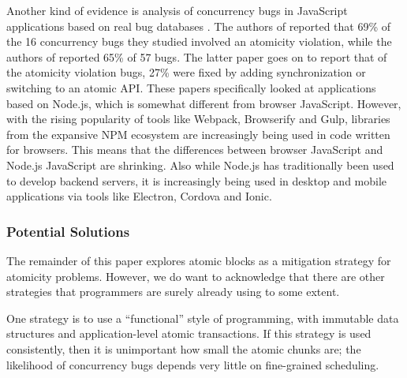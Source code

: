 \documentclass[acmsmall,anonymous,review]{acmart}\settopmatter{printfolios=true,printccs=false,printacmref=false}
\begin{document}

Another kind of evidence is analysis of concurrency bugs in JavaScript applications based on real bug databases \cite{Davis2017, Hong2014, Wang2017}.
The authors of \cite{Davis2017} reported that 69\% of the 16 concurrency bugs they studied involved an atomicity violation, while the authors of \cite{Wang2017} reported 65\% of 57 bugs.
The latter paper goes on to report that of the atomicity violation bugs, 27\% were fixed by adding synchronization or switching to an atomic API.
These papers specifically looked at applications based on Node.js, which is somewhat different from browser JavaScript.
However, with the rising popularity of tools like Webpack, Browserify and Gulp, libraries from the expansive NPM ecosystem are increasingly being used in code written for browsers.
This means that the differences between browser JavaScript and Node.js JavaScript are shrinking.
Also while Node.js has traditionally been used to develop backend servers, it is increasingly being used in desktop and mobile applications via tools like Electron, Cordova and Ionic.


\subsubsection{Potential Solutions}

The remainder of this paper explores atomic blocks as a mitigation strategy for atomicity problems.
However, we do want to acknowledge that there are other strategies that programmers are surely already using to some extent.

One strategy is to use a ``functional'' style of programming, with immutable data structures and application-level atomic transactions.
If this strategy is used consistently, then it is unimportant how small the atomic chunks are; the likelihood of concurrency bugs depends very little on fine-grained scheduling.
\end{document}
